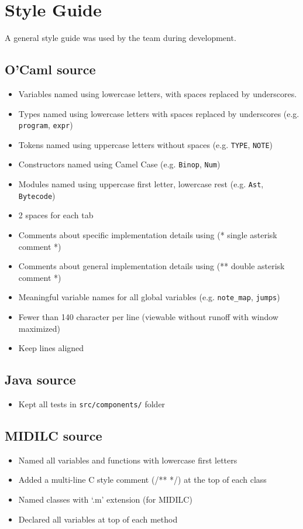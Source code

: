 \documentclass[12pt,A4]{book}
\begin{document}
\section{Style Guide}
A general style guide was used by the team during development.
\subsection{O'Caml source}
\begin{itemize}
\item Variables named using lowercase letters, with spaces replaced by underscores.
\item Types named using lowercase letters with spaces replaced by underscores (e.g. \verb|program|, \verb|expr|)
\item Tokens named using uppercase letters without spaces (e.g. \verb|TYPE|, \verb|NOTE|)
\item Constructors named using Camel Case (e.g. \verb|Binop|, \verb|Num|)
\item Modules named using uppercase first letter, lowercase rest (e.g. \verb|Ast|, \verb|Bytecode|)
\item 2 spaces for each tab
\item Comments about specific implementation details using (* single asterisk comment *)
\item Comments about general implementation details using (** double asterisk comment *)
\item Meaningful variable names for all global variables (e.g. \verb|note_map|, \verb|jumps|)
\item Fewer than 140 character per line (viewable without runoff with window maximized)
\item Keep lines aligned
\end{itemize}
\subsection{Java source}
\begin{itemize}
\item Kept all tests in \verb|src/components/| folder
\end{itemize}
\subsection{MIDILC source}
\begin{itemize}
\item Named all variables and functions with lowercase first letters
\item Added a multi-line C style comment (/** */) at the top of each class
\item Named classes with `.m' extension (for MIDILC)
\item Declared all variables at top of each method
\end{itemize}
\end{document}
